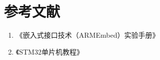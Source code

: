 \newpage

\section{参考文献}

\begin{enumerate}
  \item 《嵌入式接口技术（ARMEmbed）实验手册》
  \item 《STM32单片机教程》
\end{enumerate}